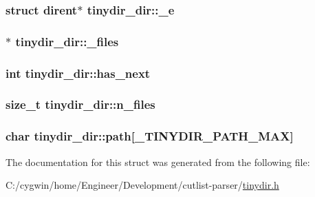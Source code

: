 \subsubsection[{\+\_\+e}]{\setlength{\rightskip}{0pt plus 5cm}struct dirent$\ast$ tinydir\+\_\+dir\+::\+\_\+e}\label{structtinydir__dir_afb1d54c34055f8feb5c1079482417db1}
\hypertarget{structtinydir__dir_aa410f654a220b8dbe75f492b0285594b}{}
\subsubsection[{\+\_\+files}]{$\ast$ tinydir\+\_\+dir\+::\+\_\+files}\label{structtinydir__dir_aa410f654a220b8dbe75f492b0285594b}
\hypertarget{structtinydir__dir_a199eae7f7fa402e1c3f5195de9beb15b}{}
\subsubsection[{has\+\_\+next}]{\setlength{\rightskip}{0pt plus 5cm}int tinydir\+\_\+dir\+::has\+\_\+next}\label{structtinydir__dir_a199eae7f7fa402e1c3f5195de9beb15b}
\hypertarget{structtinydir__dir_afcb78c8c7847fd984faf7cbb16cf9768}{}
\subsubsection[{n\+\_\+files}]{\setlength{\rightskip}{0pt plus 5cm}size\+\_\+t tinydir\+\_\+dir\+::n\+\_\+files}\label{structtinydir__dir_afcb78c8c7847fd984faf7cbb16cf9768}
\hypertarget{structtinydir__dir_a680e146c5cad2c591c658ce65c01f204}{}
\subsubsection[{path}]{\setlength{\rightskip}{0pt plus 5cm}char tinydir\+\_\+dir\+::path\mbox{[}{\bf \+\_\+\+T\+I\+N\+Y\+D\+I\+R\+\_\+\+P\+A\+T\+H\+\_\+\+M\+A\+X}\mbox{]}}\label{structtinydir__dir_a680e146c5cad2c591c658ce65c01f204}


The documentation for this struct was generated from the following file\+:\begin{DoxyCompactItemize}
\item 
C\+:/cygwin/home/\+Engineer/\+Development/cutlist-\/parser/\hyperlink{tinydir_8h}{tinydir.\+h}\end{DoxyCompactItemize}
